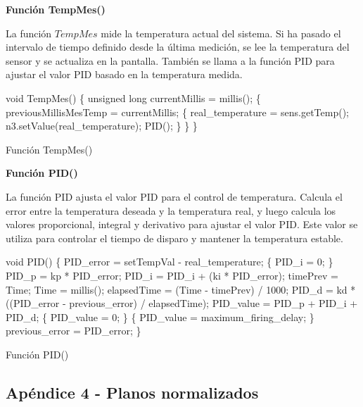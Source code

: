 \documentclass[14pt,oneside]{extarticle} %
\begin{document}
\textbf{Función TempMes()}

La función $TempMes$ mide la temperatura actual del sistema. Si ha pasado el intervalo de tiempo definido desde la última medición, se lee la temperatura del sensor y se actualiza en la pantalla. También se llama a la función PID para ajustar el valor PID basado en la temperatura medida.

\begin{algorithm}[H]
\SetAlgoLined

void TempMes() \{
    unsigned long currentMillis = millis(); \;
     \{
        previousMillisMesTemp = currentMillis; \;
         \{
            real\_temperature = sens.getTemp(); \;
            n3.setValue(real\_temperature); \;
            PID(); \} \} \} \;

\caption{Función TempMes()}
\label{al:FuncionTempMes}
\end{algorithm}

\textbf{Función PID()}

La función PID ajusta el valor PID para el control de temperatura. Calcula el error entre la temperatura deseada y la temperatura real, y luego calcula los valores proporcional, integral y derivativo para ajustar el valor PID. Este valor se utiliza para controlar el tiempo de disparo y mantener la temperatura estable.

\begin{algorithm}[H]
\SetAlgoLined

void PID() \{
    PID\_error = setTempVal - real\_temperature; \;
     \{
        PID\_i = 0; \;
    \} \;
    PID\_p = kp * PID\_error; \;
    PID\_i = PID\_i + (ki * PID\_error); \;
    timePrev = Time; \;
    Time = millis(); \;
    elapsedTime = (Time - timePrev) / 1000; \;
    PID\_d = kd * ((PID\_error - previous\_error) / elapsedTime); \;
    PID\_value = PID\_p + PID\_i + PID\_d; \;
     \{
        PID\_value = 0; \;
    \} \;
     \{
        PID\_value = maximum\_firing\_delay; \;
    \} \;
    previous\_error = PID\_error; \;
\} \;

\caption{Función PID()}
\label{al:FuncionPID}
\end{algorithm}

\clearpage
\newpage

\subsection{Apéndice 4 - Planos normalizados}
\end{document}
